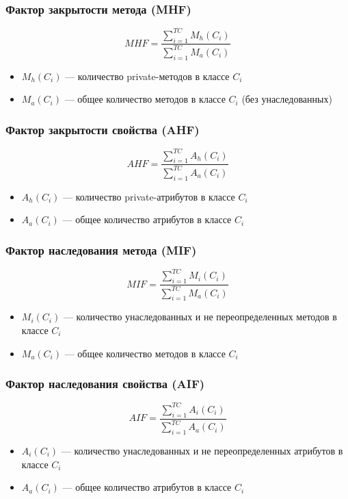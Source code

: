 \documentclass{../../slides-style}
\begin{document}
    \begin{frame}
        \frametitle{Фактор закрытости метода (MHF)}
        $$MHF = \frac{\sum\limits_{i=1}^{TC}M_h(C_i)}{\sum\limits_{i=1}^{TC}M_a(C_i)}$$
        \begin{itemize}
            \item $M_h(C_i)$ --- количество private-методов в классе $C_i$
            \item $M_a(C_i)$ --- общее количество методов в классе $C_i$ (без унаследованных)
        \end{itemize}
    \end{frame}

    \begin{frame}
        \frametitle{Фактор закрытости свойства (AHF)}
        $$AHF = \frac{\sum\limits_{i=1}^{TC}A_h(C_i)}{\sum\limits_{i=1}^{TC}A_a(C_i)}$$
        \begin{itemize}
            \item $A_h(C_i)$ --- количество private-атрибутов в классе $C_i$
            \item $A_a(C_i)$ --- общее количество атрибутов в классе $C_i$
        \end{itemize}
    \end{frame}

    \begin{frame}
        \frametitle{Фактор наследования метода (MIF)}
        $$MIF = \frac{\sum\limits_{i=1}^{TC}M_i(C_i)}{\sum\limits_{i=1}^{TC}M_a(C_i)}$$
        \begin{itemize}
            \item $M_i(C_i)$ --- количество унаследованных и не переопределенных методов в классе $C_i$
            \item $M_a(C_i)$ --- общее количество методов в классе $C_i$
        \end{itemize}
    \end{frame}

    \begin{frame}
        \frametitle{Фактор наследования свойства (AIF)}
        $$AIF = \frac{\sum\limits_{i=1}^{TC}A_i(C_i)}{\sum\limits_{i=1}^{TC}A_a(C_i)}$$
        \begin{itemize}
            \item $A_i(C_i)$ --- количество унаследованных и не переопределенных атрибутов в классе $C_i$
            \item $A_a(C_i)$ --- общее количество атрибутов в классе $C_i$
        \end{itemize}
    \end{frame}
\end{document}
